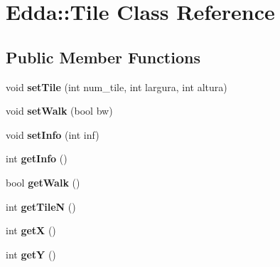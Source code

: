 \hypertarget{class_edda_1_1_tile}{
\section{Edda::Tile Class Reference}
\label{class_edda_1_1_tile}
}
\subsection*{Public Member Functions}
\begin{DoxyCompactItemize}
\item 
\hypertarget{class_edda_1_1_tile_aa52aeaf8357fefd662f2bc770fb4e2e8}{
void {\bfseries setTile} (int num\_\-tile, int largura, int altura)}
\label{class_edda_1_1_tile_aa52aeaf8357fefd662f2bc770fb4e2e8}

\item 
\hypertarget{class_edda_1_1_tile_a8ce3dfb0c44ef4ff381580b34e5969ef}{
void {\bfseries setWalk} (bool bw)}
\label{class_edda_1_1_tile_a8ce3dfb0c44ef4ff381580b34e5969ef}

\item 
\hypertarget{class_edda_1_1_tile_a03da1dda6c1e5b2e5a79e9e0b04676f4}{
void {\bfseries setInfo} (int inf)}
\label{class_edda_1_1_tile_a03da1dda6c1e5b2e5a79e9e0b04676f4}

\item 
\hypertarget{class_edda_1_1_tile_a592e4c195d4aaf3fc2862c4830e043bc}{
int {\bfseries getInfo} ()}
\label{class_edda_1_1_tile_a592e4c195d4aaf3fc2862c4830e043bc}

\item 
\hypertarget{class_edda_1_1_tile_a7a2c8952aa1fd6260585ed4c63a4980a}{
bool {\bfseries getWalk} ()}
\label{class_edda_1_1_tile_a7a2c8952aa1fd6260585ed4c63a4980a}

\item 
\hypertarget{class_edda_1_1_tile_afbfdb5dbe3aae08926e1b1d8e6481d62}{
int {\bfseries getTileN} ()}
\label{class_edda_1_1_tile_afbfdb5dbe3aae08926e1b1d8e6481d62}

\item 
\hypertarget{class_edda_1_1_tile_ae8cb5b935bfa0f206c0eb9bf0d50fd28}{
int {\bfseries getX} ()}
\label{class_edda_1_1_tile_ae8cb5b935bfa0f206c0eb9bf0d50fd28}

\item 
\hypertarget{class_edda_1_1_tile_af455bc06ee873596b5b7848f1764ca48}{
int {\bfseries getY} ()}
\label{class_edda_1_1_tile_af455bc06ee873596b5b7848f1764ca48}

\end{DoxyCompactItemize}
